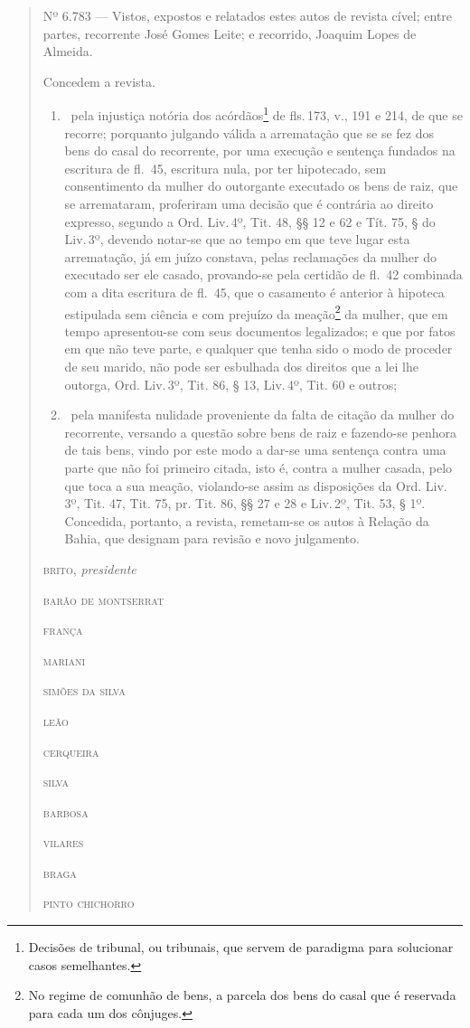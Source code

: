 \begin{quote}
Nº 6.783 --- Vistos, expostos e relatados estes autos de revista cível;
entre partes, recorrente José Gomes Leite; e recorrido, Joaquim Lopes de
Almeida.

Concedem a revista.

\begin{enumerate}[label=\arabic*º:]
\item\ pela injustiça notória dos acórdãos\footnote{Decisões de tribunal,
  ou tribunais, que servem de paradigma para solucionar casos
  semelhantes.} de fls.\,173, v., 191 e 214, de que se recorre;
porquanto julgando válida a arrematação que se se fez dos bens do casal
do recorrente, por uma execução e sentença fundados na escritura
de fl.~45, escritura nula, por ter hipotecado, sem consentimento
da mulher do outorgante executado os bens de raiz, que se arremataram,
proferiram uma decisão que é contrária ao direito expresso, segundo a
Ord. Liv.\,4º, Tit. 48, §§ 12 e 62 e Tít. 75, § do Liv.\,3º, devendo
notar-se que ao tempo em que teve lugar esta arrematação, já em juízo
constava, pelas reclamações da mulher do executado ser ele casado,
provando-se pela certidão de fl.~42 combinada com a dita escritura
de fl.~45, que o casamento é anterior à hipoteca estipulada sem
ciência e com prejuízo da meação\footnote{No regime de comunhão de
  bens, a parcela dos bens do casal que é reservada para cada um dos
  cônjuges.} da mulher, que em tempo apresentou-se com seus documentos
legalizados; e que por fatos em que não teve parte, e qualquer que tenha
sido o modo de proceder de seu marido, não pode ser esbulhada dos
direitos que a lei lhe outorga, Ord. Liv.\,3º, Tit. 86, § 13, Liv.\,4º,
Tit. 60 e outros;

\item\ pela manifesta nulidade proveniente da falta de citação da mulher do
recorrente, versando a questão sobre bens de raiz e fazendo-se penhora
de tais bens, vindo por este modo a dar-se uma sentença contra uma parte
que não foi primeiro citada, isto é, contra a mulher casada, pelo que
toca a sua meação, violando-se assim as disposições da Ord. Liv.\,3º,
Tit. 47, Tit. 75, pr. Tit. 86, §§ 27 e 28 e Liv.\,2º, Tit. 53, § 1º.
Concedida, portanto, a revista, remetam-se os autos à Relação da Bahia,
que designam para revisão e novo julgamento.
\end{enumerate}

\begin{flushright}
\textsc{brito}, \emph{presidente}

\textsc{barão de montserrat}

\textsc{frança}

\textsc{mariani}

\textsc{simões da silva}

\textsc{leão}

\textsc{cerqueira}

\textsc{silva}

\textsc{barbosa}

\textsc{vilares}

\textsc{braga}

\textsc{pinto chichorro}
\end{flushright}
\end{quote}

